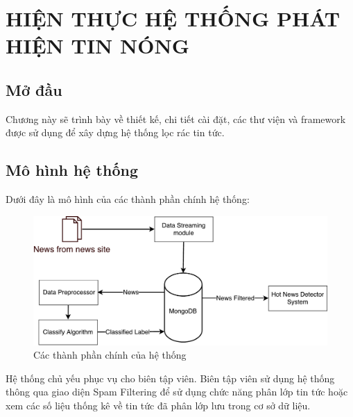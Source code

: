 \chapter{HIỆN THỰC HỆ THỐNG PHÁT HIỆN TIN NÓNG}
\ifpdf
    \graphicspath{{Chapter3/Chapter3Figs/PNG/}{Chapter3/Chapter3Figs/PDF/}{Chapter3/Chapter3Figs/}}
\else
    \graphicspath{{Chapter3/Chapter3Figs/EPS/}{Chapter3/Chapter3Figs/}}
\fi

\section{Mở đầu}
Chương này sẽ trình bày về thiết kế, chi tiết cài đặt, các thư viện và framework được sử dụng để xây dựng hệ thống lọc rác tin tức.

\section{Mô hình hệ thống}
Dưới đây là mô hình của các thành phần chính hệ thống:
\begin{figure}[H]
	\centering
	\includegraphics[width=0.9\linewidth]{Chapter3/Chapter3Figs/PDF/SystemArchitecture}
	\caption{Các thành phần chính của hệ thống}
	\label{fig:systemarchitecture}
\end{figure}

Hệ thống chủ yếu phục vụ cho biên tập viên. Biên tập viên sử dụng hệ thống thông qua giao diện Spam Filtering để sử dụng chức năng phân lớp tin tức hoặc xem các số liệu thống kê về tin tức đã phân lớp lưu trong cơ sở dữ liệu.

